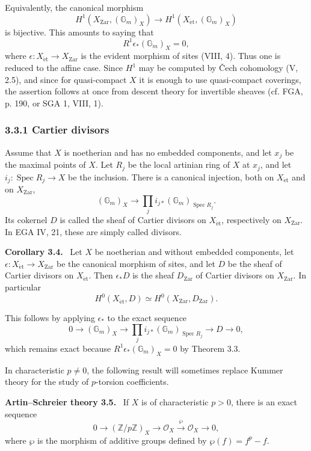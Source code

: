 \documentclass[11pt]{article}
\newcommand{\Oo}{\mathcal{O}}
\newcommand{\Zz}{\mathbb{Z}}
\newcommand{\Gm}{\mathbb{G}_m}
\newcommand{\Spec}{\operatorname{Spec}}
\newcommand{\et}{\mathrm{\acute{e}t}}
\newenvironment{statement}[1]{\par\medskip\noindent\textbf{#1.}\ }{\par\medskip}
\begin{document}
Equivalently, the canonical morphism
\[
H^1(X_{\mathrm{Zar}},(\Gm)_X)\longrightarrow H^1(X_{\et},(\Gm)_X)
\]
is bijective. This amounts to saying that
\[
R^1\epsilon_*(\Gm)_X=0,
\]
where \(\epsilon:X_{\et}\to X_{\mathrm{Zar}}\) is the evident morphism of sites (VIII, 4). Thus one is reduced to the affine case. Since \(H^1\) may be computed by \v{C}ech cohomology (V, 2.5), and since for quasi-compact \(X\) it is enough to use quasi-compact coverings, the assertion follows at once from descent theory for invertible sheaves (cf. FGA, p. 190, or SGA 1, VIII, 1).

\subsubsection*{3.3.1 Cartier divisors}
Assume that \(X\) is noetherian and has no embedded components, and let \(x_j\) be the maximal points of \(X\). Let \(R_j\) be the local artinian ring of \(X\) at \(x_j\), and let \(i_j:\Spec R_j\to X\) be the inclusion. There is a canonical injection, both on \(X_{\et}\) and on \(X_{\mathrm{Zar}}\),
\[
(\Gm)_X\longrightarrow \prod_j i_{j*}(\Gm)_{\Spec R_j}.
\]
Its cokernel \(D\) is called the sheaf of Cartier divisors on \(X_{\et}\), respectively on \(X_{\mathrm{Zar}}\). In EGA IV, 21, these are simply called divisors.

\begin{statement}{Corollary 3.4}
Let \(X\) be noetherian and without embedded components, let \(\epsilon:X_{\et}\to X_{\mathrm{Zar}}\) be the canonical morphism of sites, and let \(D\) be the sheaf of Cartier divisors on \(X_{\et}\). Then \(\epsilon_*D\) is the sheaf \(D_{\mathrm{Zar}}\) of Cartier divisors on \(X_{\mathrm{Zar}}\). In particular
\[
H^0(X_{\et},D)\simeq H^0(X_{\mathrm{Zar}},D_{\mathrm{Zar}}).
\]
\end{statement}

This follows by applying \(\epsilon_*\) to the exact sequence
\[
0\longrightarrow (\Gm)_X\longrightarrow \prod_j i_{j*}(\Gm)_{\Spec R_j}\longrightarrow D\longrightarrow 0,
\]
which remains exact because \(R^1\epsilon_*(\Gm)_X=0\) by Theorem 3.3.

In characteristic \(p\ne 0\), the following result will sometimes replace Kummer theory for the study of \(p\)-torsion coefficients.

\begin{statement}{Artin--Schreier theory 3.5}
If \(X\) is of characteristic \(p>0\), there is an exact sequence
\[
0\longrightarrow (\Zz/p\Zz)_X\longrightarrow \Oo_X\xrightarrow{\wp}\Oo_X\longrightarrow 0,
\]
where \(\wp\) is the morphism of additive groups defined by \(\wp(f)=f^p-f\).
\end{statement}
\end{document}
